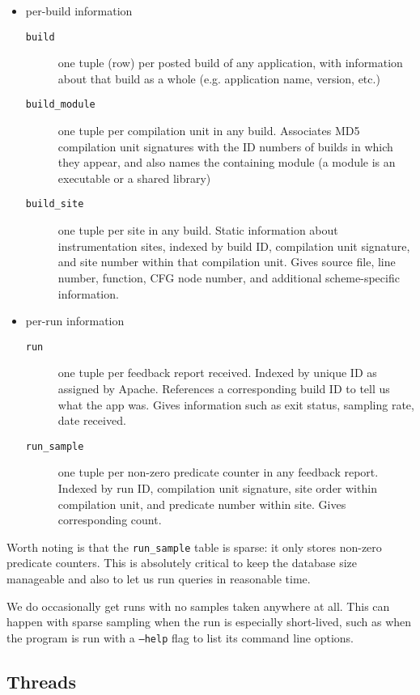 \documentclass[times,10pt,twocolumn]{article}
\begin{document}
\begin{itemize}
\item per-build information
  \begin{description}
  \item[\texttt{build}] one tuple (row) per posted build of any
    application, with information about that build as a whole (e.g.
    application name, version, etc.)
  \item[\texttt{build\_module}] one tuple per compilation unit in any
    build.  Associates MD5 compilation unit signatures with the ID
    numbers of builds in which they appear, and also names the
    containing module (a module is an executable or a shared library)
  \item[\texttt{build\_site}] one tuple per site in any build.  Static
    information about instrumentation sites, indexed by build ID,
    compilation unit signature, and site number within that
    compilation unit.  Gives source file, line number, function, CFG
    node number, and additional scheme-specific information.
  \end{description}
\item per-run information
  \begin{description}
  \item[\texttt{run}] one tuple per feedback report received.  Indexed
    by unique ID as assigned by Apache.  References a corresponding
    build ID to tell us what the app was.  Gives information such as
    exit status, sampling rate, date received.
  \item[\texttt{run\_sample}] one tuple per non-zero predicate counter
    in any feedback report.  Indexed by run ID, compilation unit
    signature, site order within compilation unit, and predicate
    number within site.  Gives corresponding count.
  \end{description}
\end{itemize}

Worth noting is that the \texttt{run\_sample} table is sparse: it only
stores non-zero predicate counters.  This is absolutely critical to
keep the database size manageable and also to let us run queries in
reasonable time.

We do occasionally get runs with no samples taken anywhere at all.
This can happen with sparse sampling when the run is especially
short-lived, such as when the program is run with a \texttt{--help}
flag to list its command line options.

\subsection{Threads}
\end{document}
